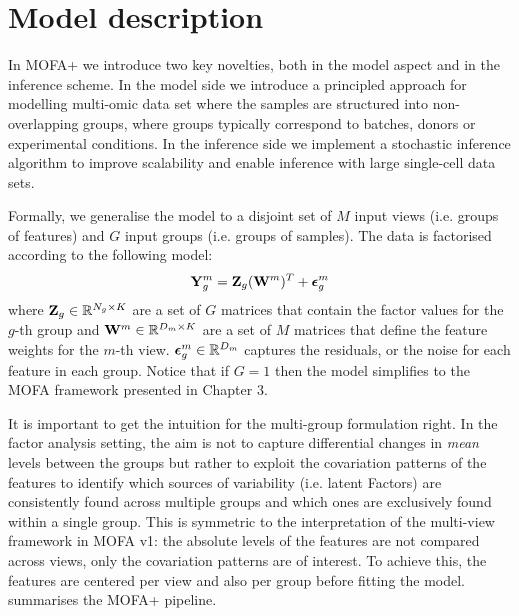 \graphicspath{{Chapter4/Figs/simulations/}{Chapter4/Figs/scrna/}{Chapter4/Figs/scmet/}{Chapter4/Figs/scnmt/}}

\section{Model description}

In MOFA+ we introduce two key novelties, both in the model aspect and in the inference scheme. In the model side we introduce a principled approach for modelling multi-omic data set where the samples are structured into non-overlapping groups, where groups typically correspond to batches, donors or experimental conditions. In the inference side we implement a stochastic inference algorithm to improve scalability and enable inference with large single-cell data sets.

Formally, we generalise the model to a disjoint set of $M$ input views (i.e. groups of features) and $G$ input groups (i.e. groups of samples). The data is factorised according to the following model:
\begin{equation} \label{mofa_master_equation}
	\mathbf{Y}^{m}_{g} = \mathbf{Z}_{g} (\mathbf{W}^{m})^T + \mbox{\boldmath $\epsilon$}^{m}_{g}
\end{equation}
where ${\bf Z}_{g} \in \mathbb{R}^{N_{g} \times K}$ are a set of $G$ matrices that contain the factor values for the $g$-th group and ${\bf W}^{m} \in \mathbb{R}^{D_m \times K}$ are a set of $M$ matrices that define the feature weights for the $m$-th view. $\mbox{\boldmath $\epsilon$}^{m}_{g} \in \mathbb{R}^{D_m}$ captures the residuals, or the noise for each feature in each group. Notice that if $G=1$ then the model simplifies to the MOFA framework presented in Chapter 3. 

It is important to get the intuition for the multi-group formulation right. In the factor analysis setting, the aim is not to capture differential changes in \textit{mean} levels between the groups but rather to exploit the covariation patterns of the features to identify which sources of variability (i.e. latent Factors) are consistently found across multiple groups and which ones are exclusively found within a single group. This is symmetric to the interpretation of the multi-view framework in MOFA v1: the absolute levels of the features are not compared across views, only the covariation patterns are of interest. To achieve this, the features are centered per view and also per group before fitting the model.  summarises the MOFA+ pipeline.

